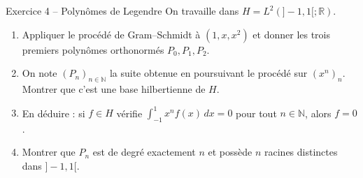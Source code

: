 \documentclass[11pt,a4paper]{article}
\newcommand{\R}{\mathbb{R}}
\newcommand{\N}{\mathbb{N}}
\theoremstyle{definition}
\begin{document}
\begin{exo}{Exercice 4 -- Polynômes de Legendre}
On travaille dans $H=L^2(]-1,1[;\R)$.
\begin{enumerate}[label=(\alph*)]
  \item Appliquer le procédé de Gram--Schmidt à $(1,x,x^2)$ et donner les trois premiers polynômes orthonormés $P_0,P_1,P_2$.
  \item On note $(P_n)_{n\in\N}$ la suite obtenue en poursuivant le procédé sur $(x^n)_n$. Montrer que c'est une base hilbertienne de $H$.
  \item En déduire : si $f\in H$ vérifie $\int_{-1}^1x^nf(x)\,dx=0$ pour tout $n\in\N$, alors $f=0$.
  \item Montrer que $P_n$ est de degré exactement $n$ et possède $n$ racines distinctes dans $]-1,1[$.
\end{enumerate}
\end{exo}
\end{document}
